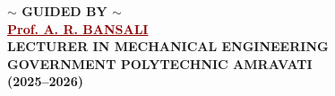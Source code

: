 \begin{center}
  {\fontsize{11}{14}\selectfont \bfseries $\sim$ GUIDED BY $\sim$}\\[2.5mm]
  {\fontsize{13}{16}\selectfont \bfseries \textcolor{darkred}{\underline{Prof. A. R. BANSALI}}}\\[1.5mm]
  {\fontsize{10}{13}\selectfont \bfseries LECTURER IN MECHANICAL ENGINEERING}\\[1mm]
  {\fontsize{10}{13}\selectfont \bfseries GOVERNMENT POLYTECHNIC AMRAVATI}\\[1.5mm]
  {\fontsize{10}{13}\selectfont \bfseries (2025--2026)}
\end{center}
\clearpage
